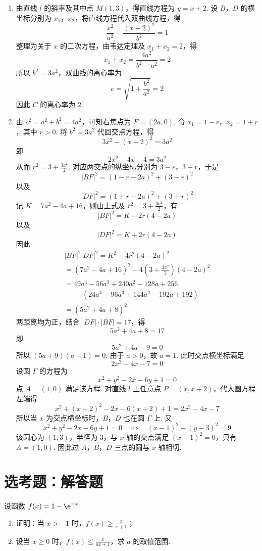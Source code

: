 \begin{solution}
\begin{enumerate}
\item 由直线 \(l\) 的斜率及其中点 \(M(1,3)\)，得直线方程为 \(y=x+2\). 设 \(B\)，\(D\) 的横坐标分别为 \(x_1\)，\(x_2\)，将直线方程代入双曲线方程，得
\[
\frac{x^2}{a^2}-\frac{(x+2)^2}{b^2}=1
\]
整理为关于 \(x\) 的二次方程，由韦达定理及 \(x_1+x_2=2\)，得
\[
x_1+x_2=\frac{4a^2}{b^2-a^2}=2
\]
所以 \(b^2=3a^2\)，双曲线的离心率为
\[
e=\sqrt{1+\frac{b^2}{a^2}}=2
\]
因此 \(C\) 的离心率为 \(2\).

\item
由 \(c^2=a^2+b^2=4a^2\)，可知右焦点为 \(F=(2a,0)\). 令 \(x_1=1-r\)，\(x_2=1+r\)，其中 \(r>0\). 将 \(b^2=3a^2\) 代回交点方程，得
\[
3x^2-(x+2)^2=3a^2
\]
即
\[
2x^2-4x-4=3a^2
\]
从而 \(r^2=3+\frac{3a^2}{2}\). 对应两交点的纵坐标分别为 \(3-r\)，\(3+r\)，于是
\[
|BF|^2=(1-r-2a)^2+(3-r)^2
\]
以及
\[
|DF|^2=(1+r-2a)^2+(3+r)^2
\]
记 \(K=7a^2-4a+16\)，则由上式及 \(r^2=3+\frac{3a^2}{2}\)，有
\[
|BF|^2=K-2r(4-2a)
\]
以及
\[
|DF|^2=K+2r(4-2a)
\]
因此
\[
\begin{gathered}
|BF|^2|DF|^2
 =K^2-4r^2(4-2a)^2\\
 =(7a^2-4a+16)^2-4\left(3+\frac{3a^2}{2}\right)(4-2a)^2\\
 =49a^4-56a^3+240a^2-128a+256\\
 \mathrel{\phantom{=}}-(24a^4-96a^3+144a^2-192a+192)\\
 =(5a^2+4a+8)^2
\end{gathered}
\]
两距离均为正，结合 \(|DF|\cdot|BF|=17\)，得
\[
5a^2+4a+8=17
\]
即
\[
5a^2+4a-9=0
\]
所以 \((5a+9)(a-1)=0\). 由于 \(a>0\)，故 \(a=1\). 此时交点横坐标满足
\[
2x^2-4x-7=0
\]
设圆 \(\Gamma\) 的方程为
\[
x^2+y^2-2x-6y+1=0
\]
点 \(A=(1,0)\) 满足该方程. 对直线 \(l\) 上任意点 \(P=(x,x+2)\)，代入圆方程左端得
\[
x^2+(x+2)^2-2x-6(x+2)+1=2x^2-4x-7
\]
所以当 \(x\) 为交点横坐标时，\(B\)，\(D\) 也在圆 \(\Gamma\) 上. 又
\[
x^2+y^2-2x-6y+1=0\quad\Longleftrightarrow\quad (x-1)^2+(y-3)^2=9
\]
该圆心为 \((1,3)\)，半径为 \(3\)，与 \(x\) 轴的交点满足 \((x-1)^2=0\)，只有 \(A=(1,0)\). 因此过 \(A\)，\(B\)，\(D\) 三点的圆与 \(x\) 轴相切.
\end{enumerate}
\end{solution}

\section{选考题：解答题}

\begin{problem}
设函数 \( f(x) = 1 - \e^{-x} \).
\begin{enumerate}
\item 证明：当 \(x > -1\) 时，\(f(x) \geqslant \frac{x}{x + 1}\)；
\item 设当 \(x \geqslant 0\) 时，\(f(x) \leqslant \frac{x}{ax + 1}\)，求 \(a\) 的取值范围.
\end{enumerate}
\end{problem}

